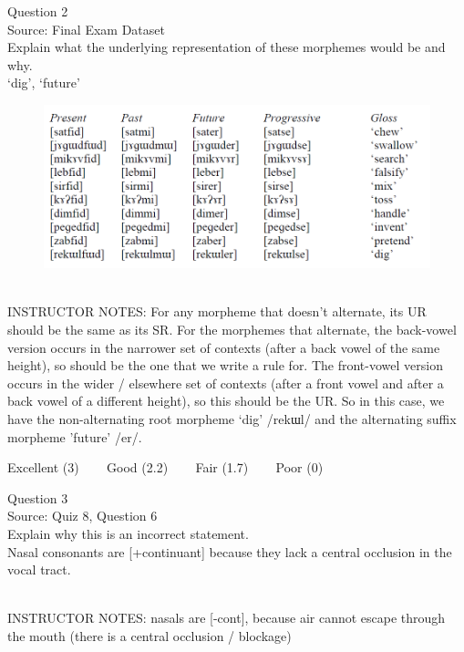\documentclass[12pt]{article}
\begin{document}
{\large Question 2}\\

Source: Final Exam Dataset\\

Explain what the underlying representation of these morphemes would be and why.\\

`dig', `future'

\begin{figure}[H]
\includegraphics{../images/final_dataset.png}
\end{figure}

~\\
INSTRUCTOR NOTES: For any morpheme that doesn’t alternate, its UR should be the same as its SR.  For the morphemes that alternate, the back-vowel version occurs in the narrower set of contexts (after a back vowel of the same height), so should be the one that we write a rule for. The front-vowel version occurs in the wider / elsewhere set of contexts (after a front vowel and after a back vowel of a different height), so this should be the UR. So in this case, we have the non-alternating root morpheme ‘dig’ /rekɯl/ and the alternating suffix morpheme 'future' /er/.


\vfill
Excellent (3) ~~~ Good (2.2) ~~~ Fair (1.7) ~~~ Poor (0)
\newpage

{\large Question 3}\\

Source: Quiz 8, Question 6\\

Explain why this is an incorrect statement.\\

Nasal consonants are {[+continuant]} because they lack a central occlusion in the vocal tract.


~\\
INSTRUCTOR NOTES: nasals are [-cont], because air cannot escape through the mouth (there is a central occlusion / blockage)
\end{document}
